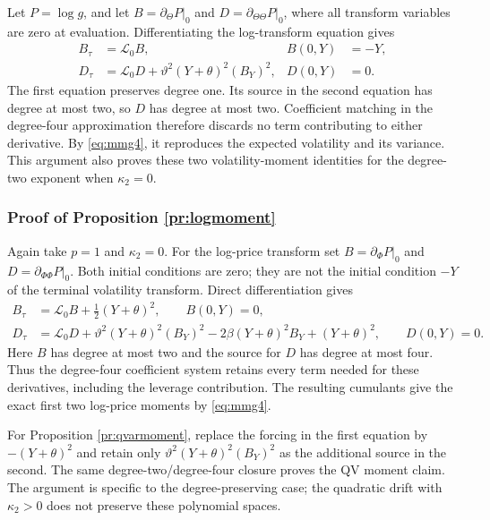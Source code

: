 \documentclass[11pt,a4paper] {article}
\begin{document}
Let $P=\log g$, and let $B=\partial_\Theta P|_0$ and
$D=\partial_{\Theta\Theta}P|_0$, where all transform variables are zero at
evaluation. Differentiating the log-transform equation gives
\begin{equation}\label{eq:mv1}
\begin{aligned}
B_\tau&=\mathcal L_0B, & B(0,Y)&=-Y,\\
D_\tau&=\mathcal L_0D+\vartheta^2(Y+\theta)^2(B_Y)^2,
&D(0,Y)&=0.
\end{aligned}
\end{equation}
The first equation preserves degree one. Its source in the second equation has
degree at most two, so $D$ has degree at most two. Coefficient matching in the
degree-four approximation therefore discards no term contributing to either
derivative. By \eqref{eq:mmg4}, it reproduces the expected volatility and its
variance. This argument also proves these two volatility-moment identities for
the degree-two exponent when $\kappa_2=0$.

\subsubsection{Proof of Proposition \ref{pr:logmoment}}\label{app:logmoment}

Again take $p=1$ and $\kappa_2=0$. For the log-price transform set
$B=\partial_\Phi P|_0$ and $D=\partial_{\Phi\Phi}P|_0$. Both initial
conditions are zero; they are not the initial condition $-Y$ of the terminal
volatility transform. Direct differentiation gives
\begin{equation}\label{eq:mpr1}
\begin{split}
B_\tau&=\mathcal L_0B+\frac12(Y+\theta)^2,\qquad B(0,Y)=0,\\
D_\tau&=\mathcal L_0D+\vartheta^2(Y+\theta)^2(B_Y)^2
 -2\beta(Y+\theta)^2B_Y+(Y+\theta)^2,\qquad D(0,Y)=0.
\end{split}
\end{equation}
Here $B$ has degree at most two and the source for $D$ has degree at most four.
Thus the degree-four coefficient system retains every term needed for these
derivatives, including the leverage contribution. The resulting cumulants give
the exact first two log-price moments by \eqref{eq:mmg4}.

For Proposition \ref{pr:qvarmoment}, replace the forcing in the first equation
by $-(Y+\theta)^2$ and retain only
$\vartheta^2(Y+\theta)^2(B_Y)^2$ as the additional source in the second.
The same degree-two/degree-four closure proves the QV moment claim.
The argument is specific to the degree-preserving case; the quadratic drift
with $\kappa_2>0$ does not preserve these polynomial spaces.
\end{document}
